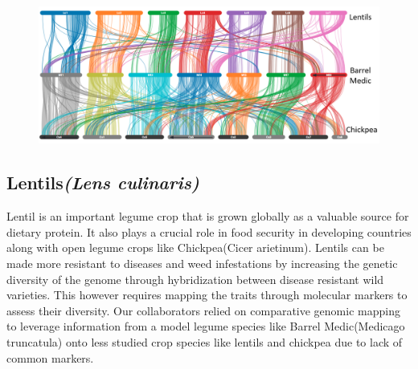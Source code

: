 \begin{figure}
  \centering
  \includegraphics[width=1\linewidth]{images/ch_6_lentils.png}
  \label{fig:ch_6_lentils}
\end{figure}


\subsection{Lentils\textit{(Lens culinaris)}}
Lentil is an important legume crop that is grown globally as a valuable source for dietary protein. It also plays a crucial role in food security in developing countries along with open legume crops like Chickpea(Cicer arietinum)\cite{varshney2013draft}. Lentils can be made more resistant to diseases and weed infestations by increasing the genetic diversity of the genome through hybridization between disease resistant wild varieties. This however requires mapping the traits through molecular markers to assess their diversity. Our collaborators relied on comparative genomic mapping to leverage information from a model legume species like Barrel Medic(Medicago truncatula) onto less studied crop species like lentils and chickpea due to lack of common markers.

